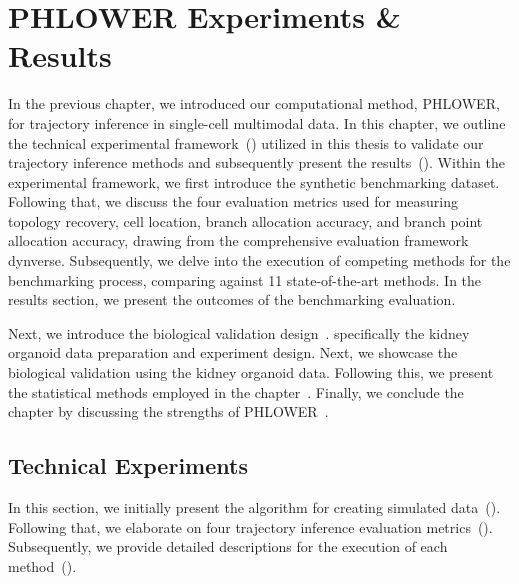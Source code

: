 \chapter{PHLOWER Experiments \& Results}
\label{chapter:PHLOWER_bench}
\graphicspath{{chapter6/figs}}


In the previous chapter, we introduced our computational method, PHLOWER, for trajectory inference in single-cell multimodal data. In this chapter, we outline the technical experimental framework~() utilized in this thesis to validate our trajectory inference methods and subsequently present the results~(). Within the experimental framework, we first introduce the synthetic benchmarking dataset. Following that, we discuss the four evaluation metrics used for measuring topology recovery, cell location, branch allocation accuracy, and branch point allocation accuracy, drawing from the comprehensive evaluation framework dynverse. Subsequently, we delve into the execution of competing methods for the benchmarking process, comparing against 11 state-of-the-art methods. In the results section, we present the outcomes of the benchmarking evaluation.

Next, we introduce the biological validation design~. specifically the kidney organoid data preparation and experiment design. Next, we showcase the biological validation using the kidney organoid data. Following this, we present the statistical methods employed in the chapter~. Finally, we conclude the chapter by discussing the strengths of PHLOWER~.



\section{Technical Experiments}
\label{PHLOWER_bench:tech_exp}
In this section, we initially present the algorithm for creating simulated data~(). Following that, we elaborate on four trajectory inference evaluation metrics~(). Subsequently, we provide detailed descriptions for the execution of each method~().


